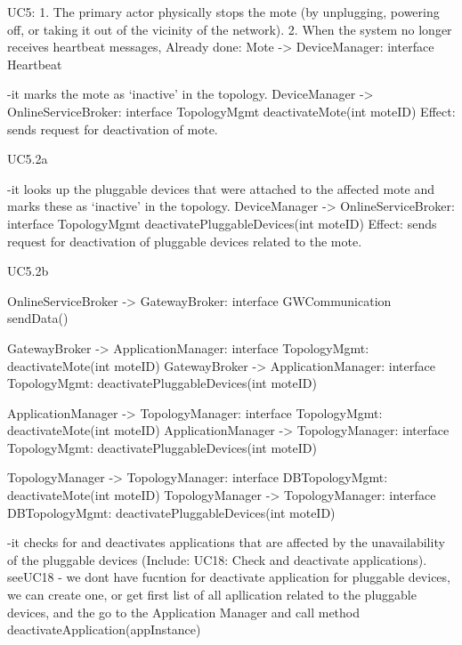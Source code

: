     UC5:
        1. The primary actor physically stops the mote (by unplugging, powering off, or taking it out of
            the vicinity of the network).
        2. When the system no longer receives heartbeat messages,
            Already done: Mote -> DeviceManager: interface Heartbeat
            
            -it marks the mote as `inactive' in the topology.
            DeviceManager -> OnlineServiceBroker: interface TopologyMgmt deactivateMote(int moteID)
            Effect: sends request for deactivation of mote.
            \item UC5.2a
            
            -it looks up the pluggable devices that were attached to the affected mote and marks these
                as `inactive' in the topology.
            DeviceManager -> OnlineServiceBroker: interface TopologyMgmt deactivatePluggableDevices(int moteID)
            Effect: sends request for deactivation of pluggable devices related to the mote.
            \item UC5.2b
            
            OnlineServiceBroker -> GatewayBroker: interface GWCommunication
            sendData()
            
            GatewayBroker -> ApplicationManager: interface TopologyMgmt: deactivateMote(int moteID)
            GatewayBroker -> ApplicationManager: interface TopologyMgmt: deactivatePluggableDevices(int moteID)
            
            ApplicationManager -> TopologyManager: interface TopologyMgmt: deactivateMote(int moteID)
            ApplicationManager -> TopologyManager: interface TopologyMgmt: deactivatePluggableDevices(int moteID)
            
            TopologyManager -> TopologyManager: interface DBTopologyMgmt: deactivateMote(int moteID)
            TopologyManager -> TopologyManager: interface DBTopologyMgmt: deactivatePluggableDevices(int moteID)
            
            -it checks for and deactivates applications that are affected by the unavailability of the
                pluggable devices (Include: UC18: Check and deactivate applications).
                seeUC18 - we dont have fucntion for deactivate application for pluggable devices, we can create one, or get 
                            first list of all apllication related to the pluggable devices, and the go to the Application Manager and 
                            call method deactivateApplication(appInstance)
                
